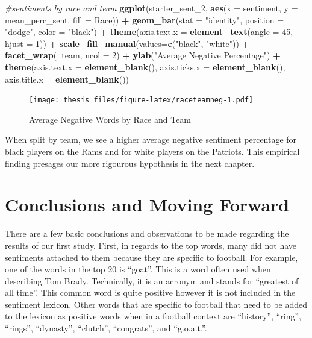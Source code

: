 \documentclass[12pt,twoside]{reedthesis}
\newenvironment{Shaded}{\begin{snugshade}}{\end{snugshade}}
\newcommand{\KeywordTok}[1]{\textcolor[rgb]{0.13,0.29,0.53}{\textbf{#1}}}
\newcommand{\DataTypeTok}[1]{\textcolor[rgb]{0.13,0.29,0.53}{#1}}
\newcommand{\DecValTok}[1]{\textcolor[rgb]{0.00,0.00,0.81}{#1}}
\newcommand{\StringTok}[1]{\textcolor[rgb]{0.31,0.60,0.02}{#1}}
\newcommand{\CommentTok}[1]{\textcolor[rgb]{0.56,0.35,0.01}{\textit{#1}}}
\newcommand{\OperatorTok}[1]{\textcolor[rgb]{0.81,0.36,0.00}{\textbf{#1}}}
\newcommand{\NormalTok}[1]{#1}
\begin{document}
\small
\begin{Shaded}
\begin{Highlighting}[]
\CommentTok{#sentiments by race and team}
\KeywordTok{ggplot}\NormalTok{(starter_sent_}\DecValTok{2}\NormalTok{, }\KeywordTok{aes}\NormalTok{(}\DataTypeTok{x =}\NormalTok{ sentiment, }\DataTypeTok{y =}\NormalTok{ mean_perc_sent, }
                           \DataTypeTok{fill =}\NormalTok{ Race)) }\OperatorTok{+}
\StringTok{  }\KeywordTok{geom_bar}\NormalTok{(}\DataTypeTok{stat =} \StringTok{"identity"}\NormalTok{, }\DataTypeTok{position =} \StringTok{"dodge"}\NormalTok{, }\DataTypeTok{color =} \StringTok{"black"}\NormalTok{) }\OperatorTok{+}
\StringTok{  }\KeywordTok{theme}\NormalTok{(}\DataTypeTok{axis.text.x =} \KeywordTok{element_text}\NormalTok{(}\DataTypeTok{angle =} \DecValTok{45}\NormalTok{, }\DataTypeTok{hjust =} \DecValTok{1}\NormalTok{)) }\OperatorTok{+}
\StringTok{  }\KeywordTok{scale_fill_manual}\NormalTok{(}\DataTypeTok{values=}\KeywordTok{c}\NormalTok{(}\StringTok{"black"}\NormalTok{, }\StringTok{"white"}\NormalTok{)) }\OperatorTok{+}\StringTok{ }
\StringTok{  }\KeywordTok{facet_wrap}\NormalTok{(}\OperatorTok{~}\NormalTok{team, }\DataTypeTok{ncol =} \DecValTok{2}\NormalTok{) }\OperatorTok{+}
\StringTok{  }\KeywordTok{ylab}\NormalTok{(}\StringTok{"Average Negative Percentage"}\NormalTok{) }\OperatorTok{+}
\StringTok{  }\KeywordTok{theme}\NormalTok{(}\DataTypeTok{axis.text.x =} \KeywordTok{element_blank}\NormalTok{(), }
        \DataTypeTok{axis.ticks.x =} \KeywordTok{element_blank}\NormalTok{(), }
        \DataTypeTok{axis.title.x =} \KeywordTok{element_blank}\NormalTok{())}
\end{Highlighting}
\end{Shaded}
\begin{figure}
\centering
\texttt{[image: thesis\_files/figure-latex/raceteamneg-1.pdf]}
\caption{\label{fig:raceteamneg}Average Negative Words by Race and Team}
\end{figure}
\normalsize
When split by team, we see a higher average negative sentiment
percentage for black players on the Rams and for white players on the
Patriots. This empirical finding presages our more rigourous hypothesis
in the next chapter.

\section{Conclusions and Moving
Forward}\label{conclusions-and-moving-forward}

There are a few basic conclusions and observations to be made regarding
the results of our first study. First, in regards to the top words, many
did not have sentiments attached to them because they are specific to
football. For example, one of the words in the top 20 is ``goat''. This
is a word often used when describing Tom Brady. Technically, it is an
acronym and stands for ``greatest of all time''. This common word is
quite positive however it is not included in the sentiment lexicon.
Other words that are specific to football that need to be added to the
lexicon as positive words when in a football context are ``history'',
``ring'', ``rings'', ``dynasty'', ``clutch'', ``congrats'', and
``g.o.a.t.''.
\end{document}
